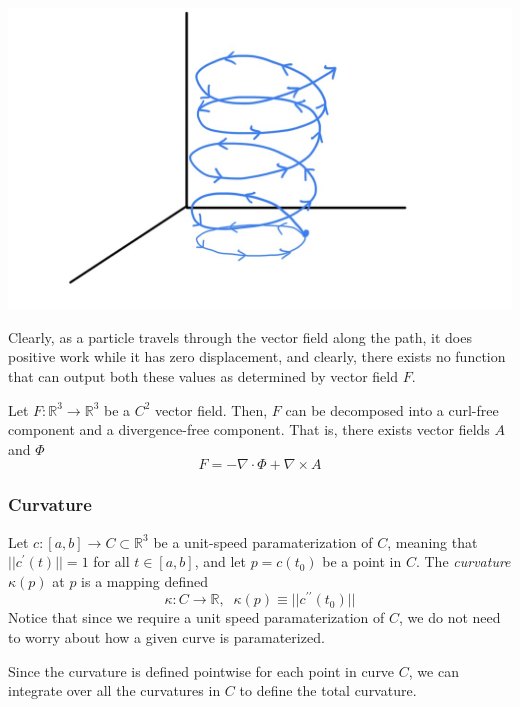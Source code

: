  \begin{center}
      \includegraphics[scale=0.28]{img/Solenoid_nonconservative.jpg}
  \end{center}
  Clearly, as a particle travels through the vector field along the path, it does positive work while it has zero displacement, and clearly, there exists no function that can output both these values as determined by vector field $F$. 

  \begin{theorem}
  Let $F: \mathbb{R}^3 \longrightarrow \mathbb{R}^3$ be a $C^2$ vector field. Then, $F$ can be decomposed into a curl-free component and a divergence-free component. That is, there exists vector fields $A$ and $\Phi$
  \[F = - \nabla \cdot \Phi + \nabla \times A\]
  \end{theorem}

  \subsubsection{Curvature}
  \begin{definition}
  Let $c: [a, b] \longrightarrow C \subset \mathbb{R}^3$ be a unit-speed paramaterization of $C$, meaning that $||c^\prime (t)|| = 1$ for all $t \in [a,b]$, and let $p = c(t_0)$ be a point in $C$. The \textit{curvature} $\kappa(p)$ at $p$ is a mapping defined
  \[\kappa: C \longrightarrow \mathbb{R}, \;\; \kappa(p) \equiv ||c^{\prime \prime} (t_0)||\]
  Notice that since we require a unit speed paramaterization of $C$, we do not need to worry about how a given curve is paramaterized. 
  \end{definition}

  Since the curvature is defined pointwise for each point in curve $C$, we can integrate over all the curvatures in $C$ to define the total curvature. 

